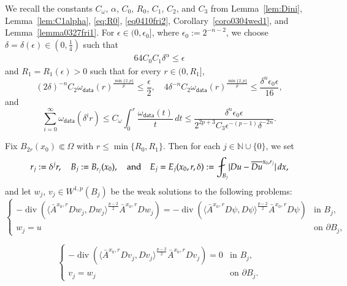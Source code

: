\documentclass[reqno]{amsart}
\numberwithin{equation}{section}
\theoremstyle{plain}
\theoremstyle{definition}
\theoremstyle{remark}
\DeclareMathOperator{\dv}{div}
\providecommand{\set}[1]{\{#1\}}
\providecommand{\abs}[1]{\lvert#1\rvert}
\providecommand{\ip}[1]{\langle#1\rangle}
\begin{document}
We recall the constants $C_\omega$, $\alpha$,  $C_0$, $R_0$,  $C_1$, $C_2$, and $C_3$ from Lemma~\ref{lem:Dini}, Lemma~\ref{lem:C1alpha}, \eqref{eq:R0}, \eqref{eq0410fri2}, Corollary~\ref{coro0304wed1}, and Lemma~\ref{lemma0327fri1}. 
For $\epsilon\in(0,\epsilon_0]$,  where $\epsilon_0:=2^{-n-2}$, we choose 
$\delta=\delta(\epsilon) \in (0,\frac{1}{4})$ such that
\begin{align}\label{eq:delta1}
64C_0C_1\delta^\alpha\leq \epsilon
\end{align} 
and $R_1=R_1(\epsilon)>0$ such that for every $r\in(0,R_1]$,
\begin{equation}\label{eq:R11}
(2\delta)^{-n} C_2 \omega_{\mathsf{data}}(r)^{\frac{\min\set{2,p}}{p}}\le \frac{\epsilon}{2}, \quad 4\delta^{-n}C_2 \omega_{\mathsf{data}}(r)^{\frac{\min\set{2,p}}{p}}\le  \frac{\delta^n \epsilon_0 \epsilon}{16},
\end{equation}
and
\begin{equation}\label{eq:R12}
\sum^\infty_{i=0} \omega_{\mathsf{data}}(\delta^i r) \le C_\omega \int^{r}_0\frac{\omega_\mathsf{data}(t)}{t}\,dt \leq  \frac{\delta^n  \epsilon_0 \epsilon }{2^{2p+3}C_3\epsilon^{-(p-1)}\delta^{-2n} } .
\end{equation}
 

Fix $B_{2r}(x_0)\Subset\Omega$ with $r\le \min\{R_0,R_1\}$.  Then for each $j\in \mathbb{N}\cup \set{0}$, we set
\[
r_j:=\delta^j r,
\quad B_j:=B_{r_j}(x_0), 
\quad\hbox{and}\quad E_j=E_j(x_0,r,\delta):=\fint_{B_j}\abs{Du-\overline{Du}^{x_0,r_j}} \,dx,
\]
and   let $w_j$, $v_j\in W^{1,p}(B_j)$ be the weak solutions to the following problems:
\begin{equation*} 
\begin{cases}
-\dv ( \ip{\bar{A}^{x_0,r}Dw_j, Dw_j }^{\frac{p-2}{2}} \bar{A}^{x_0,r} Dw_j)
=- \dv ( \ip{\bar{A}^{x_0,r} D\psi, D\psi }^{\frac{p-2}{2}} \bar{A}^{x_0,r} D\psi) 
& \text{in } B_j, \\
 w_j= u & \text{on } \partial B_j,
\end{cases}
\end{equation*}
 

\begin{equation*}
\begin{cases}
-\dv ( \ip{\bar{A}^{x_0,r}Dv_j, Dv _j}^{\frac{p-2}{2}} \bar{A}^{x_0,r} Dv_j)
 =0
& \text{in } B_j, \\
 v_j= w_j & \text{on } \partial B_j.
\end{cases}
\end{equation*}
\end{document}
